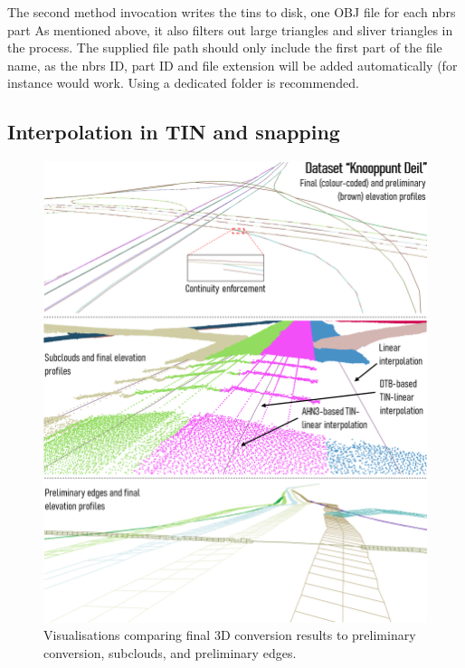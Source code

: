 The second method invocation writes the \ac{tin}s to disk, one OBJ file for each \ac{nbrs} part As mentioned above, it also filters out large triangles and sliver triangles in the process. The supplied file path should only include the first part of the file name, as the \ac{nbrs} ID, part ID and file extension will be added automatically (for instance  would work. Using a dedicated folder is recommended.

\subsection{Interpolation in TIN and snapping}
\label{sub:r_interpolation}

\begin{figure}
    \centering
    \includegraphics[width=\linewidth]{final_report/figs/elevationinterpolation0.png}
    \caption{Visualisations comparing final 3D conversion results to preliminary conversion, subclouds, and preliminary edges.}
    \label{fig:elevationinterpolation0}
\end{figure}

